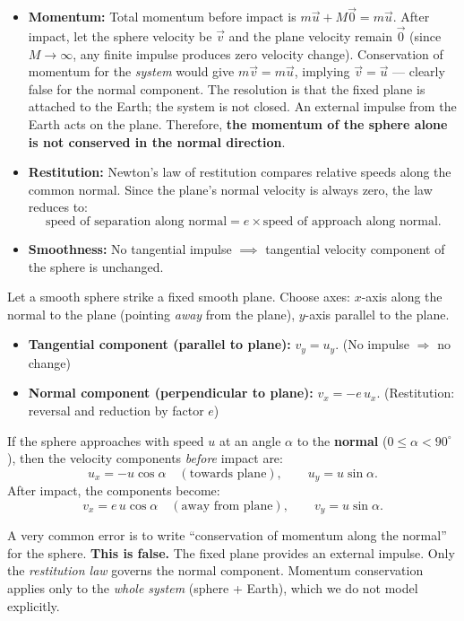 \documentclass[11pt]{article}
\newcounter{popsec}
\newcounter{popsub}
\newcommand{\courssub}[1]{%
  \stepcounter{popsub}%
  \par\vspace{9pt}\noindent{\popxbold\fontsize{11.5}{13}\selectfont\color{popink}{\color{poporange}\thepopsec.\thepopsub}\hspace{6pt}#1}\par\nopagebreak\vspace{4pt}
}
\begin{document}
\begin{itemize}
    \item \textbf{Momentum:} Total momentum before impact is $m\vec{u} + M\vec{0} = m\vec{u}$. After impact, let the sphere velocity be $\vec{v}$ and the plane velocity remain $\vec{0}$ (since $M\to\infty$, any finite impulse produces zero velocity change). Conservation of momentum for the \emph{system} would give $m\vec{v} = m\vec{u}$, implying $\vec{v}=\vec{u}$ — clearly false for the normal component. The resolution is that the fixed plane is attached to the Earth; the system is not closed. An external impulse from the Earth acts on the plane. Therefore, \textbf{the momentum of the sphere alone is not conserved in the normal direction}.
    \item \textbf{Restitution:} Newton's law of restitution compares relative speeds along the common normal. Since the plane's normal velocity is always zero, the law reduces to:
    \[ \text{speed of separation along normal} = e \times \text{speed of approach along normal}. \]
    \item \textbf{Smoothness:} No tangential impulse $\implies$ tangential velocity component of the sphere is unchanged.
\end{itemize}

\courssub{The Two Component Rules}

\begin{propriete}
Let a smooth sphere strike a fixed smooth plane. Choose axes: $x$-axis along the normal to the plane (pointing \emph{away} from the plane), $y$-axis parallel to the plane.
\begin{itemize}
    \item \textbf{Tangential component (parallel to plane):} $v_y = u_y$. \quad (No impulse $\Rightarrow$ no change)
    \item \textbf{Normal component (perpendicular to plane):} $v_x = -e\, u_x$. \quad (Restitution: reversal and reduction by factor $e$)
\end{itemize}
If the sphere approaches with speed $u$ at an angle $\alpha$ to the \textbf{normal} ($0 \le \alpha < 90^\circ$), then the velocity components \emph{before} impact are:
\[ u_x = -u\cos\alpha \quad (\text{towards plane}), \qquad u_y = u\sin\alpha. \]
After impact, the components become:
\[ v_x = e\,u\cos\alpha \quad (\text{away from plane}), \qquad v_y = u\sin\alpha. \]
\end{propriete}

\begin{attention}
A very common error is to write ``conservation of momentum along the normal'' for the sphere. \textbf{This is false.} The fixed plane provides an external impulse. Only the \emph{restitution law} governs the normal component. Momentum conservation applies only to the \emph{whole system} (sphere + Earth), which we do not model explicitly.
\end{attention}
\end{document}
